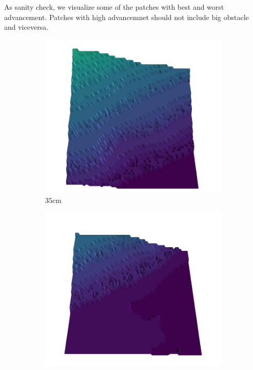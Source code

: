 \documentclass[../document.tex]{subfiles}
\begin{document}
As sanity check, we visualize some of the patches with best and worst advancement. Patches with high advancemnet should not include big obstacle and viceversa.
\begin{figure}[H]
    \centering
    \begin{subfigure}[b]{0.19\textwidth}
    \includegraphics[width=\linewidth]{../img/5/quarry/all/best/35-patch-3d-majavi-colormap-0.png}
    \caption{$35$cm}
    \end{subfigure}
    \begin{subfigure}[b]{0.19\textwidth}
    \includegraphics[width=\linewidth]{../img/5/quarry/all/best/38-patch-3d-majavi-colormap-1.png}

\end{subfigure}
\end{figure}
\end{document}
